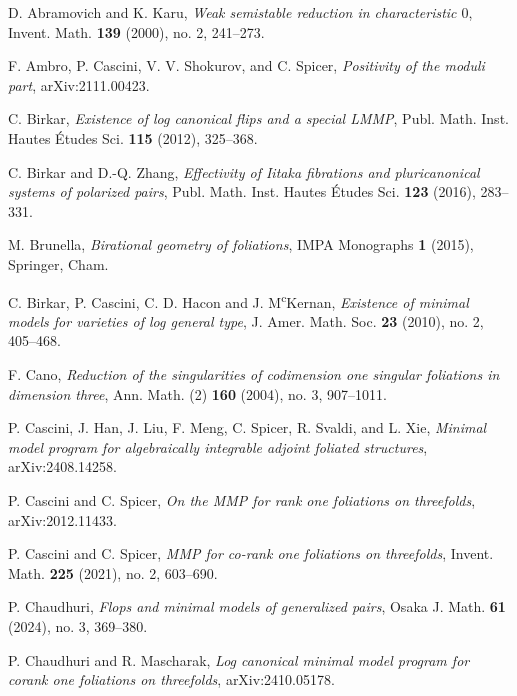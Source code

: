 \documentclass[preprint,12pt]{elsarticle}
\begin{document}
\begin{thebibliography}{00}

 D. Abramovich and K. Karu, \textit{Weak semistable reduction in characteristic $0$}, Invent. Math. \textbf{139} (2000), no. 2, 241--273.

 F. Ambro, P. Cascini, V. V. Shokurov, and C. Spicer, \textit{Positivity of the moduli part}, arXiv:2111.00423.


 C. Birkar, \textit{Existence of log canonical flips and a special LMMP}, Publ. Math. Inst. Hautes \'Etudes Sci. \textbf{115} (2012), 325--368.

 C. Birkar and D.-Q. Zhang, \textit{Effectivity of Iitaka fibrations and pluricanonical systems of polarized pairs}, Publ. Math. Inst. Hautes \'Etudes Sci. \textbf{123} (2016), 283--331.

 M. Brunella, \textit{Birational geometry of foliations}, IMPA Monographs \textbf{1} (2015), Springer, Cham.

 C. Birkar, P. Cascini, C. D. Hacon and J. M\textsuperscript{c}Kernan, \textit{Existence of minimal models for varieties of log general type}, J. Amer. Math. Soc. \textbf{23} (2010), no. 2, 405--468.


 F. Cano, \textit{Reduction of the singularities of codimension one singular foliations in dimension three}, Ann. Math. (2) \textbf{160} (2004), no. 3, 907--1011.

 P. Cascini, J. Han, J. Liu, F. Meng, C. Spicer, R. Svaldi, and L. Xie, \textit{Minimal model program for algebraically integrable adjoint foliated structures}, arXiv:2408.14258.


 P. Cascini and C. Spicer, \textit{On the MMP for rank one foliations on threefolds}, arXiv:2012.11433.

 P. Cascini and C. Spicer, \textit{MMP for co-rank one foliations on threefolds}, Invent. Math. \textbf{225} (2021), no. 2, 603–690.

 P. Chaudhuri, \textit{Flops and minimal models of generalized pairs}, Osaka J. Math. \textbf{61} (2024), no. 3, 369--380.

 P. Chaudhuri and R. Mascharak, \textit{Log canonical minimal model program for corank one foliations on threefolds}, arXiv:2410.05178.



\end{thebibliography}
\end{document}
